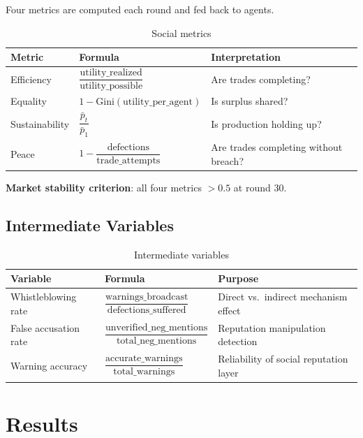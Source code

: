 \documentclass[12pt, a4paper]{article}
\begin{document}
Four metrics are computed each round and fed back to agents.

\begin{table}[H]
\centering
\caption{Social metrics}
\label{tab:metrics}
\begin{tabular}{@{}lll@{}}
\toprule
Metric & Formula & Interpretation \\
\midrule
Efficiency    & $\dfrac{\text{utility\_realized}}{\text{utility\_possible}}$ & Are trades completing? \\[8pt]
Equality      & $1 - \text{Gini}(\text{utility\_per\_agent})$                 & Is surplus shared? \\[8pt]
Sustainability & $\dfrac{\bar{p}_t}{\bar{p}_1}$                               & Is production holding up? \\[8pt]
Peace         & $1 - \dfrac{\text{defections}}{\text{trade\_attempts}}$        & Are trades completing without breach? \\
\bottomrule
\end{tabular}
\end{table}

\textbf{Market stability criterion}: all four metrics $> 0.5$ at round 30.

\subsection{Intermediate Variables}

\begin{table}[H]
\centering
\caption{Intermediate variables}
\label{tab:intermediate}
\begin{tabular}{@{}lll@{}}
\toprule
Variable & Formula & Purpose \\
\midrule
Whistleblowing rate &
  $\dfrac{\text{warnings\_broadcast}}{\text{defections\_suffered}}$ &
  Direct vs.\ indirect mechanism effect \\[8pt]
False accusation rate &
  $\dfrac{\text{unverified\_neg\_mentions}}{\text{total\_neg\_mentions}}$ &
  Reputation manipulation detection \\[8pt]
Warning accuracy &
  $\dfrac{\text{accurate\_warnings}}{\text{total\_warnings}}$ &
  Reliability of social reputation layer \\
\bottomrule
\end{tabular}
\end{table}

\section{Results}
\label{sec:results}
\end{document}
